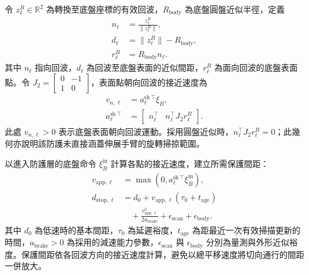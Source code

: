 令 $z_{\ell}^{B}\in\mathbb{R}^{2}$ 為轉換至底盤座標的有效回波，$R_{\mathrm{body}}$ 為底盤圓盤近似半徑，定義
\begin{equation}
    \begin{aligned}
        n_{\ell}
        &=\frac{z_{\ell}^{B}}{\|z_{\ell}^{B}\|}, \\
        d_{\ell}
        &=\|z_{\ell}^{B}\|-R_{\mathrm{body}}, \\
        r_{\ell}^{B}
        &=R_{\mathrm{body}}n_{\ell}.
    \end{aligned}
    \label{eq:ch3_scan_surface_geometry}
\end{equation}
其中 $n_{\ell}$ 指向回波，$d_{\ell}$ 為回波至底盤表面的近似間距，$r_{\ell}^{B}$ 為面向回波的底盤表面點。令 $J_2=\begin{bmatrix}0&-1\\1&0\end{bmatrix}$，表面點朝向回波的接近速度為
\begin{equation}
    \begin{aligned}
        v_{n,\ell}
        &=a_{\ell}^{\mathrm{sh}\,\top}\xi_B, \\
        a_{\ell}^{\mathrm{sh}\,\top}
        &=\begin{bmatrix}
            n_{\ell}^{\top} & n_{\ell}^{\top}J_2r_{\ell}^{B}
          \end{bmatrix}.
    \end{aligned}
    \label{eq:ch3_scan_approach_velocity}
\end{equation}
此處 $v_{n,\ell}>0$ 表示底盤表面朝向回波運動。採用圓盤近似時，$n_{\ell}^{\top}J_2r_{\ell}^{B}=0$；此幾何亦說明該防護未直接涵蓋伸展手臂的旋轉掃掠範圍。

以進入防護層的底盤命令 $\xi_B^{\mathrm{in}}$ 計算各點的接近速度，建立所需保護間距：
\begin{equation}
    \begin{aligned}
        v_{\mathrm{app},\ell}
        &=\max\!\left(0,
          a_{\ell}^{\mathrm{sh}\,\top}\xi_B^{\mathrm{in}}\right), \\
        d_{\mathrm{stop},\ell}
        &=d_0+v_{\mathrm{app},\ell}(\tau_0+t_{\mathrm{age}}) \\
        &\quad+\frac{v_{\mathrm{app},\ell}^{2}}{2a_{\mathrm{brake}}}
          +\epsilon_{\mathrm{scan}}+\epsilon_{\mathrm{body}}.
    \end{aligned}
    \label{eq:ch3_scan_stopping_distance}
\end{equation}
其中 $d_0$ 為低速時的基本間距，$\tau_0$ 為延遲裕度，$t_{\mathrm{age}}$ 為距最近一次有效掃描更新的時間，$a_{\mathrm{brake}}>0$ 為採用的減速能力參數，$\epsilon_{\mathrm{scan}}$ 與 $\epsilon_{\mathrm{body}}$ 分別為量測與外形近似裕度。保護間距依各回波方向的接近速度計算，避免以總平移速度將切向通行的間距一併放大。


